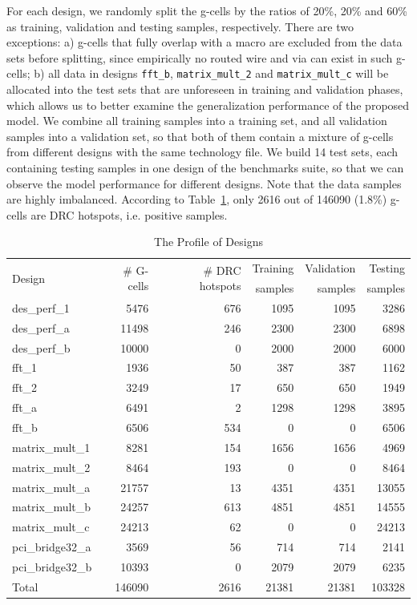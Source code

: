 \documentclass[10pt, final, letter, twocolumns]{IEEEtran}
\begin{document}
For each design, we randomly split the g-cells by the ratios of 20\%, 20\% and 60\% as training, validation and testing samples, respectively. There are two exceptions: a) g-cells that fully overlap with a macro are excluded from the data sets before splitting, since empirically no routed wire and via can exist in such g-cells; b) all data in designs \texttt{fft\_b}, \texttt{matrix\_mult\_2} and \texttt{matrix\_mult\_c} will be allocated into the test sets that are unforeseen in training and validation phases, which allows us to better examine the generalization performance of the proposed model. We combine all training samples into a training set, and all validation samples into a validation set, so that both of them contain a mixture of g-cells from different designs with the same technology file. We build 14 test sets, each containing testing samples in one design of the benchmarks suite, so that we can observe the model performance for different designs. Note that the data samples are highly imbalanced. According to Table~\ref{tab:dataset}, only 2616 out of 146090 (1.8\%) g-cells are DRC hotspots, i.e. positive samples.

\begin{table}[t]
\caption{The Profile of Designs}\vspace{-3mm}
\label{tab:dataset}
\centering
\tabcolsep=3.0pt
\scriptsize
\begin{tabular}{lrrrrr}
\toprule
\multirow{2}{*}{Design} & \multirow{2}{*}{\# G-cells} & \multirow{2}{*}{\# DRC hotspots} & Training & Validation & Testing\\
 &&& samples &  samples &  samples\\
\midrule
des\_perf\_1 & 5476 & 676 & 1095 & 1095 & 3286\\
des\_perf\_a & 11498 & 246 & 2300 & 2300 & 6898\\
des\_perf\_b & 10000 & 0 & 2000 & 2000 & 6000\\
fft\_1 & 1936 & 50 & 387 & 387 & 1162\\
fft\_2 & 3249 & 17 & 650 & 650 & 1949 \\
fft\_a & 6491 & 2 & 1298 & 1298 & 3895\\
fft\_b & 6506 & 534 & 0 & 0 & 6506\\
matrix\_mult\_1 & 8281 & 154 & 1656 & 1656 & 4969\\
matrix\_mult\_2 & 8464 & 193 & 0 & 0 & 8464 \\
matrix\_mult\_a & 21757 & 13 & 4351 & 4351 & 13055\\
matrix\_mult\_b & 24257 & 613 & 4851 & 4851 & 14555\\
matrix\_mult\_c & 24213 & 62 & 0 & 0 & 24213 \\
pci\_bridge32\_a & 3569 & 56 & 714 & 714 & 2141\\
pci\_bridge32\_b & 10393 & 0 & 2079 & 2079 & 6235\\
\midrule
Total & 146090 & 2616 & 21381 & 21381 & 103328\\
\bottomrule
\end{tabular}\vspace{-3mm}
\end{table}
\end{document}
